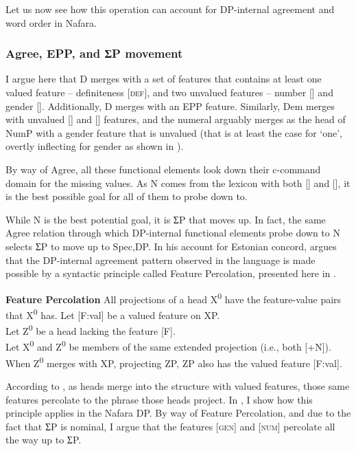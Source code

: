 \documentclass[output=paper]{langscibook}
\begin{document}
Let us now see how this operation can account for DP-internal agreement and word order in Nafara.


\subsubsection{Agree, EPP, and ƩP movement}

I argue here that D merges with a set of features that contains at least one valued feature – definiteness [\textsc{def}], and two unvalued features – number [{\NUM}] and gender [{\GEN}]. Additionally, D merges with an EPP feature. Similarly, Dem merges with unvalued [{\NUM}] and [{\GEN}] features, and the numeral arguably merges as the head of NumP with a gender feature that is unvalued (that is at least the case for ‘one’, overtly inflecting for gender as shown in ).  

By way of Agree, all these functional elements look down their c-command domain for the missing values. As N comes from the lexicon with both [{\NUM}] and [{\GEN}], it is the best possible goal for all of them to probe down to. 

While N is the best potential goal, it is ƩP that moves up. In fact, the same Agree relation through which DP-internal functional elements probe down to N selects ƩP to move up to Spec,DP. In his account for Estonian concord, \citet{Norris2014} argues that the DP-internal agreement pattern observed in the language is made possible by a syntactic principle called Feature Percolation, presented here in .


\begin{exe}\ex\label{ex:baron:19}
\textbf{Feature Percolation} \citep[135 (242)]{Norris2014}
\xlista
\ex All projections of a head X\textsuperscript{0} have the feature-value pairs that X\textsuperscript{0} has.
\ex Let [F:val] be a valued feature on XP.\\
   Let Z\textsuperscript{0} be a head lacking the feature [F].\\
   Let X\textsuperscript{0} and Z\textsuperscript{0} be members of the same extended projection (i.e., both [+N]).\\
   When Z\textsuperscript{0} merges with XP, projecting ZP, ZP also has the valued feature [F:val].
\endxlista
\end{exe}


According to , as heads merge into the structure with valued features, those same features percolate to the phrase those heads project. In , I show how this principle applies in the Nafara DP. By way of Feature Percolation, and due to the fact that ƩP is nominal, I argue that the features \textsc{[gen]} and \textsc{[num]} percolate all the way up to ƩP. 
\end{document}

